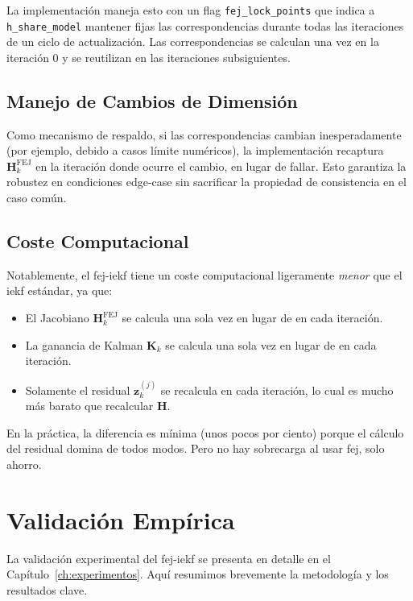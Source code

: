 La implementación maneja esto con un flag \texttt{fej\_lock\_points} que indica
a \texttt{h\_share\_model} mantener fijas las correspondencias durante todas las
iteraciones de un ciclo de actualización. Las correspondencias se calculan una
vez en la iteración 0 y se reutilizan en las iteraciones subsiguientes.

\subsection{Manejo de Cambios de Dimensión}
\label{sec:fej-cambio-dimension}

Como mecanismo de respaldo, si las correspondencias cambian inesperadamente
(por ejemplo, debido a casos límite numéricos), la implementación recaptura
$\mathbf{H}_k^{\text{FEJ}}$ en la iteración donde ocurre el cambio, en lugar de
fallar. Esto garantiza la robustez en condiciones edge-case sin sacrificar la
propiedad de consistencia en el caso común.

\subsection{Coste Computacional}
\label{sec:fej-coste-computacional}

Notablemente, el \gls{fej}-\gls{iekf} tiene un coste computacional ligeramente
\emph{menor} que el \gls{iekf} estándar, ya que:

\begin{itemize}
    \item El Jacobiano $\mathbf{H}_k^{\text{FEJ}}$ se calcula una sola vez en
    lugar de en cada iteración.
    \item La ganancia de Kalman $\mathbf{K}_k$ se calcula una sola vez en lugar
    de en cada iteración.
    \item Solamente el residual $\mathbf{z}_k^{(j)}$ se recalcula en cada
    iteración, lo cual es mucho más barato que recalcular $\mathbf{H}$.
\end{itemize}

En la práctica, la diferencia es mínima (unos pocos por ciento) porque el
cálculo del residual domina de todos modos. Pero no hay sobrecarga al usar
\gls{fej}, solo ahorro.

\section{Validación Empírica}
\label{sec:fej-validacion}

La validación experimental del \gls{fej}-\gls{iekf} se presenta en detalle en
el Capítulo~\ref{ch:experimentos}. Aquí resumimos brevemente la metodología y
los resultados clave.

